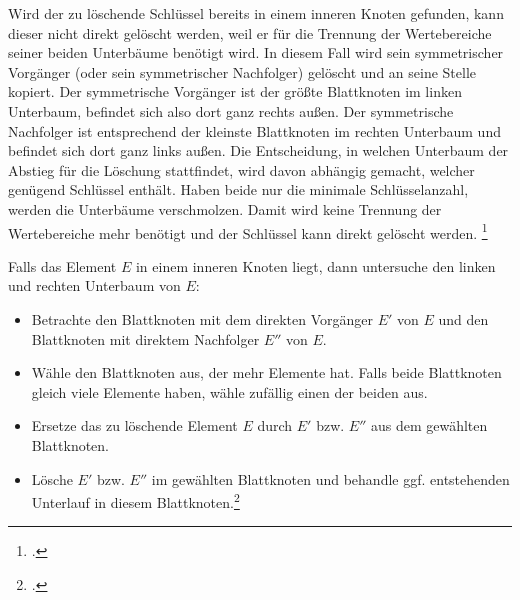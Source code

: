 \documentclass{lehramt-informatik-haupt}
\begin{document}
Wird der zu löschende Schlüssel bereits in einem inneren Knoten
gefunden, kann dieser nicht direkt gelöscht werden, weil er für die
Trennung der Wertebereiche seiner beiden Unterbäume benötigt wird. In
diesem Fall wird sein symmetrischer Vorgänger (oder sein symmetrischer
Nachfolger) gelöscht und an seine Stelle kopiert. Der symmetrische
Vorgänger ist der größte Blattknoten im linken Unterbaum, befindet sich
also dort ganz rechts außen. Der symmetrische Nachfolger ist
entsprechend der kleinste Blattknoten im rechten Unterbaum und befindet
sich dort ganz links außen. Die Entscheidung, in welchen Unterbaum der
Abstieg für die Löschung stattfindet, wird davon abhängig gemacht,
welcher genügend Schlüssel enthält. Haben beide nur die minimale
Schlüsselanzahl, werden die Unterbäume verschmolzen. Damit wird keine
Trennung der Wertebereiche mehr benötigt und der Schlüssel kann direkt
gelöscht werden.
\footcite{wiki:bbaum}

Falls das Element $E$ in einem inneren Knoten liegt, dann
untersuche den linken und rechten Unterbaum von $E$:

\begin{itemize}
\item Betrachte den Blattknoten mit dem direkten Vorgänger $E'$ von $E$
und den Blattknoten mit direktem Nachfolger $E''$ von $E$.

\item Wähle den Blattknoten aus, der mehr Elemente hat. Falls beide
Blattknoten gleich viele Elemente haben, wähle zufällig einen der beiden
aus.

\item Ersetze das zu löschende Element $E$ durch $E'$ bzw. $E''$ aus dem
gewählten Blattknoten.

\item Lösche $E'$ bzw. $E''$ im gewählten Blattknoten und behandle ggf.
entstehenden Unterlauf in diesem Blattknoten.\footcite[Seite
39]{aud:fs:5}
\end{itemize}


\literatur
\end{document}
